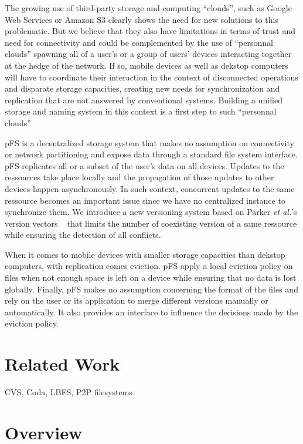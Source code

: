 \documentclass[letterpaper,twocolumn,10pt]{article}
\begin{document}
The growing use of third-party storage and computing ``clouds'', such
as Google Web Services or Amazon S3 clearly shows the need for new
solutions to this problematic. But we believe that they also have
limitations in terms of trust and need for connectivity and could be
complemented by the use of ``personnal clouds'' spawning all of a
user's or a group of users' devices interacting together at the hedge
of the network. If so, mobile devices as well as dekstop computers
will have to coordinate their interaction in the context of
disconnected operations and disparate storage capacities, creating new
needs for synchronization and replication that are not answered by
conventional systems. Building a unified storage and naming system in
this context is a first step to such ``personnal clouds''.

pFS is a decentralized storage system that makes no assumption on
connectivity or network partitioning and expose data through a
standard file system interface. pFS replicates all or a
subset of the user's data on all devices. Updates to the ressources
take place locally and the propagation of those updates to other
devices happen asynchronously. In such context, concurrent updates to
the same ressource becomes an important issue since we have no
centralized instance to synchronize them. We introduce a new
versioning system based on Parker \emph{et al.}'s version vectors
~\cite{Parker1983} that limits the number of coexisting version of a
same ressource while ensuring the detection of all conflicts.

When it comes to mobile devices with smaller storage capacities than
dekstop computers, with replication comes eviction. pFS apply a local
eviction policy on files when not enough space is left on a device
while ensuring that no data is lost globally. Finally, pFS makes no
assumption concerning the format of the files and rely on the user or
its application to merge different versions manually or automatically.
It also provides an interface to influence the decisions made by the
eviction policy.

\section{Related Work}

CVS, Coda, LBFS, P2P filesystems

\section{Overview}
\end{document}

